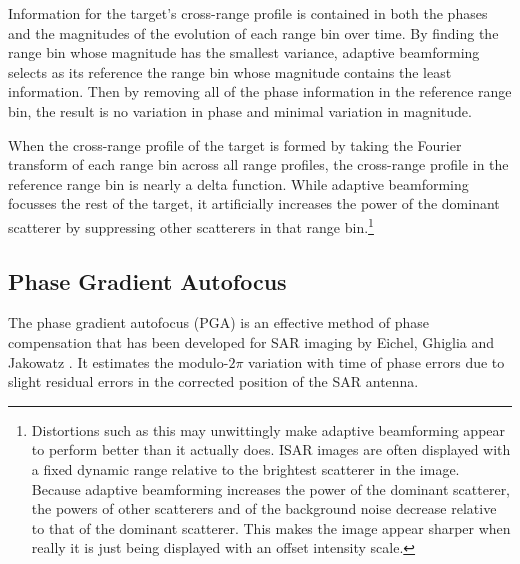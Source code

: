 Information for the target's cross-range profile is contained in both
the phases and the magnitudes of the evolution of each range bin over time.
By finding the range bin whose magnitude has the smallest variance, adaptive 
beamforming selects as its reference the range bin whose magnitude
contains the least information.  Then by removing all of the phase
information in the reference range bin, the result is no variation in phase
and minimal variation in magnitude.  

When the cross-range profile of the target is formed by taking the
Fourier transform of each range bin across all range profiles, the
cross-range profile in the reference range bin is nearly a delta function. 
While adaptive beamforming focusses the rest of the target, it artificially
increases the power of the dominant scatterer by suppressing other
scatterers in that range bin.\footnote{Distortions such as this may
unwittingly make adaptive beamforming appear to perform better than it
actually does.  ISAR images are often displayed with a fixed dynamic range
relative to the brightest scatterer in the image.  Because adaptive
beamforming increases the power of the dominant scatterer, the powers of
other scatterers and of the background noise decrease relative to that of
the dominant scatterer.  This makes the image appear sharper when really it
is just being displayed with an offset intensity scale.}

\subsection{Phase Gradient Autofocus}
\label{mc sec:pga}

The phase gradient autofocus (PGA) is an effective method of phase
compensation that has been developed for SAR imaging by Eichel, Ghiglia and
Jakowatz \cite{Eic89,Eic89b,Jak89}.  It estimates the modulo-$2\pi$
variation with time of phase errors due to slight residual errors in the
corrected position of the SAR antenna.

